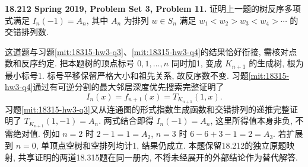 \begin{exercise}\label{mit:18212-pset3-q11}
\textbf{18.212 Spring 2019, Problem Set 3, Problem 11.}
证明上一题的树反序多项式满足 $I_n(-1)=A_n$, 其中 $A_n$ 为排列 $w\in S_n$ 满足 $w_1<w_2>w_3<w_4>\cdots$ 的交错排列数.
\end{exercise}
\begin{solution}
这道题与习题\ref{mit:18315-hw3-q3}、\ref{mit:18315-hw3-q4}的结果恰好衔接, 需核对点数和反序约定. 把本题树的顶点标号 $0,1,\ldots,n$ 同时加1, 变成 $K_{n+1}$ 的生成树, 根为最小标号1. 标号平移保留严格大小和祖先关系, 故反序数不变. 习题\ref{mit:18315-hw3-q4}通过有可逆分割的最大邻居深度优先搜索完整证明了
\[
 I_n(x)=f_{n+1}(x)=T_{K_{n+1}}(1,x).
\]
习题\ref{mit:18315-hw3-q3}又从连通图的形式指数生成函数和交错排列的递推完整证明了
$T_{K_{n+1}}(1,-1)=A_n$. 两式结合即得 $I_n(-1)=A_n$, 这里所得值本身非负, 不需绝对值. 例如 $n=2$ 时 $2-1=1=A_2$, $n=3$ 时 $6-6+3-1=2=A_3$. 若扩展到 $n=0$, 单顶点空树和空排列均计1, 结果仍成立. 本题保留18.212的独立原题映射, 共享证明的两道18.315题在同一册内, 不将未经展开的外部结论作为替代解答.
\end{solution}

